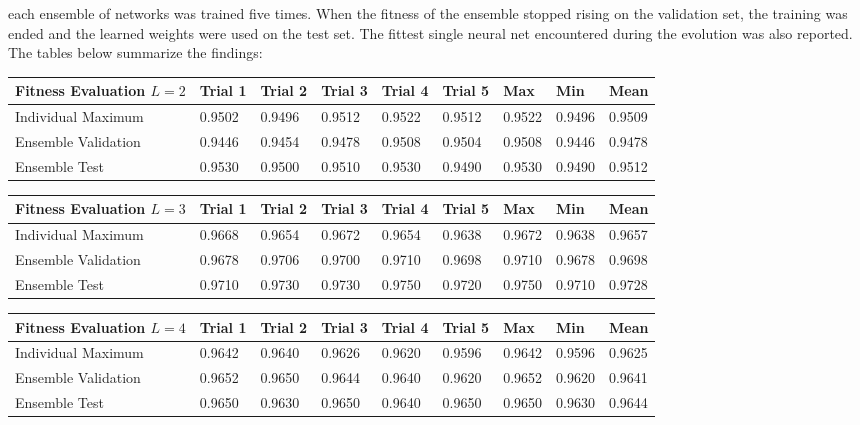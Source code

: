 \documentclass{article}
\DeclareMathOperator{\1}{\mathbbm{1}}
\begin{document}
each ensemble of networks was trained five times. When the fitness of the ensemble stopped rising on the validation set, the 
training was ended and the learned weights were used on the test set. The fittest single neural net encountered during the
evolution was also reported. The tables below summarize the findings:

\begin{center}
    \begin{tabular}{ | l | l | l | l | l | l | l | l | l |}
    \hline
    Fitness Evaluation $L = 2$ & Trial 1 & Trial 2 & Trial 3 & Trial 4 & Trial 5 & Max & Min & Mean \\ \hline
    Individual Maximum & 0.9502 & 0.9496 & 0.9512 & 0.9522 & 0.9512 & 0.9522 & 0.9496 & 0.9509 \\\hline
    Ensemble Validation & 0.9446 & 0.9454 & 0.9478 & 0.9508 & 0.9504 & 0.9508 & 0.9446& 0.9478\\\hline
  Ensemble Test & 0.9530 & 0.9500 & 0.9510 & 0.9530 & 0.9490 & 0.9530 & 0.9490 & 0.9512\\\hline
    \end{tabular}
\end{center}

\begin{center}
    \begin{tabular}{ | l | l | l | l | l | l | l | l | l |}
    \hline
    Fitness Evaluation $L = 3$ & Trial 1 & Trial 2 & Trial 3 & Trial 4 & Trial 5 & Max & Min & Mean \\ \hline
    Individual Maximum & 0.9668 & 0.9654 & 0.9672 & 0.9654 & 0.9638 & 0.9672 & 0.9638 & 0.9657 \\\hline
    Ensemble Validation & 0.9678 & 0.9706 & 0.9700 & 0.9710 & 0.9698 & 0.9710 & 0.9678& 0.9698\\\hline
  Ensemble Test & 0.9710 & 0.9730 & 0.9730 & 0.9750 & 0.9720 & 0.9750 & 0.9710 & 0.9728\\\hline
    \end{tabular}
\end{center}

\begin{center}
    \begin{tabular}{ | l | l | l | l | l | l | l | l | l |}
    \hline
    Fitness Evaluation $L = 4$ & Trial 1 & Trial 2 & Trial 3 & Trial 4 & Trial 5 & Max & Min & Mean \\ \hline
    Individual Maximum & 0.9642 & 0.9640 & 0.9626 & 0.9620 & 0.9596 & 0.9642 & 0.9596 & 0.9625 \\\hline
    Ensemble Validation & 0.9652 & 0.9650 & 0.9644 & 0.9640 & 0.9620 & 0.9652 & 0.9620 & 0.9641\\\hline
  Ensemble Test & 0.9650 & 0.9630 & 0.9650 & 0.9640 & 0.9650 & 0.9650 & 0.9630 & 0.9644\\\hline
    \end{tabular}
\end{center}
\end{document}
